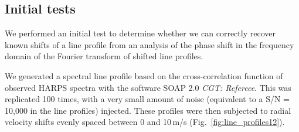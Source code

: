 
\subsection{Initial tests}

We performed an initial test to determine whether we can correctly recover known shifts of a line profile  
from an analysis of the phase shift in the frequency domain of the Fourier transform of shifted line profiles.

We generated a spectral line profile based on the cross-correlation function of observed HARPS spectra
with the software SOAP 2.0 {\em CGT: Referece}. This was replicated 100 times, with a very small amount of 
noise (equivalent to a S/N = 10,000 in the line profiles) injected. These profiles were then
subjected to radial velocity shifts evenly spaced between 0 and 10\,m/s (Fig.~\ref{fig:line_profiles12}). 

